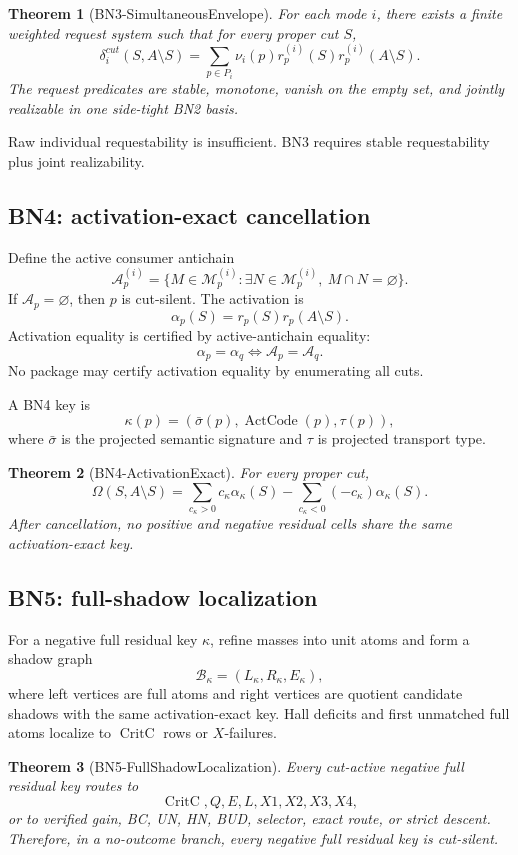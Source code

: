 \documentclass[10.5pt,a4paper]{article}
\newtheorem{theorem}{Theorem}[section]
\newcommand{\ActCode}{\operatorname{ActCode}}
\newcommand{\CritC}{\operatorname{CritC}}
\begin{document}
\begin{theorem}[BN3-SimultaneousEnvelope]
For each mode \(i\), there exists a finite weighted request system such that for every proper cut \(S\),
\[
\delta_i^{cut}(S,A\setminus S)=
\sum_{p\in P_i}\nu_i(p)r_p^{(i)}(S)r_p^{(i)}(A\setminus S).
\]
The request predicates are stable, monotone, vanish on the empty set, and jointly realizable in one side-tight BN2 basis.
\end{theorem}

Raw individual requestability is insufficient. BN3 requires stable requestability plus joint realizability.

\subsection{BN4: activation-exact cancellation}
Define the active consumer antichain
\[
\mathcal A_p^{(i)}=\{M\in\mathcal M_p^{(i)}:\exists N\in\mathcal M_p^{(i)},\ M\cap N=\varnothing\}.
\]
If \(\mathcal A_p=\varnothing\), then \(p\) is cut-silent. The activation is
\[
\alpha_p(S)=r_p(S)r_p(A\setminus S).
\]
Activation equality is certified by active-antichain equality:
\[
\alpha_p=\alpha_q\Longleftrightarrow \mathcal A_p=\mathcal A_q.
\]
No package may certify activation equality by enumerating all cuts.

A BN4 key is
\[
\kappa(p)=(\bar\sigma(p),\ActCode(p),\tau(p)),
\]
where \(\bar\sigma\) is the projected semantic signature and \(\tau\) is projected transport type.

\begin{theorem}[BN4-ActivationExact]
For every proper cut,
\[
\Omega(S,A\setminus S)=
\sum_{c_\kappa>0}c_\kappa\alpha_\kappa(S)-
\sum_{c_\kappa<0}(-c_\kappa)\alpha_\kappa(S).
\]
After cancellation, no positive and negative residual cells share the same activation-exact key.
\end{theorem}

\subsection{BN5: full-shadow localization}
For a negative full residual key \(\kappa\), refine masses into unit atoms and form a shadow graph
\[
\mathcal B_\kappa=(L_\kappa,R_\kappa,E_\kappa),
\]
where left vertices are full atoms and right vertices are quotient candidate shadows with the same activation-exact key. Hall deficits and first unmatched full atoms localize to \(\CritC\) rows or \(X\)-failures.

\begin{theorem}[BN5-FullShadowLocalization]
Every cut-active negative full residual key routes to
\[
\CritC,Q,E,L,X1,X2,X3,X4,
\]
or to verified gain, BC, UN, HN, BUD, selector, exact route, or strict descent. Therefore, in a no-outcome branch, every negative full residual key is cut-silent.
\end{theorem}
\end{document}
